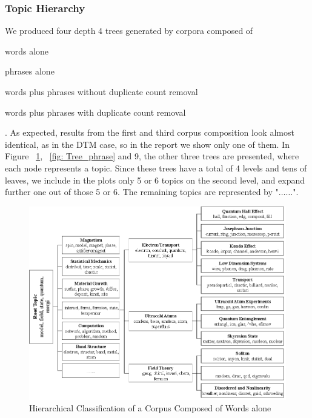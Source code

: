 \documentclass[DIV=calc, paper=letter, fontsize=10pt, twocolumn]{scrartcl}	 %
\begin{document}
\subsubsection*{Topic Hierarchy}
 We produced four depth 4 trees generated by corpora composed of
 \begin{inparaenum}
 \item  words alone
 \item phrases alone
 \item words plus phrases without duplicate count removal
 \item words plus phrases with duplicate count removal
 \end{inparaenum}
. As expected, results from the first and third corpus composition look almost identical, as in the DTM case, so in the report we show only one of them. In Figure ~\ref{fig: Tree_words}, ~\ref{fig: Tree_phrase} and 9, the other three trees are presented, where each node represents a topic. Since these trees have a total of 4 levels and tens of leaves, we include in the plots only 5 or 6 topics on the second level, and expand further one out of those 5 or 6. The remaining topics are represented by "$\ldots \ldots$". 
\begin{figure}[!ht]
	\centerline{\includegraphics[scale = 0.75]{tree_words.eps}}
	\caption{Hierarchical Classification of a Corpus Composed of Words alone}
	 \label{fig: Tree_words}
\end{figure}
\end{document}

